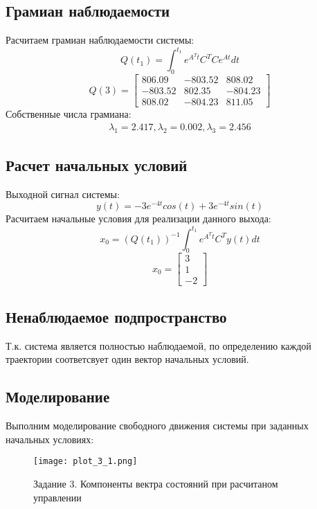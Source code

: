 \subsection{Грамиан наблюдаемости}
Расчитаем грамиан наблюдаемости системы:
\begin{equation}
    Q(t_1) = \int_{0}^{t_1}e^{A^Tt}C^TCe^{At}dt
\end{equation}
\begin{equation*}
    Q(3) = \begin{bmatrix}
        806.09 & -803.52 & 808.02 \\
        -803.52 & 802.35 & -804.23 \\
        808.02 & -804.23 & 811.05
        \end{bmatrix}
\end{equation*}
Собственные числа грамиана:
\begin{eqnarray*}
    \lambda_1 = 2.417, \lambda_2 = 0.002, \lambda_3 = 2.456
\end{eqnarray*}

\subsection{Расчет начальных условий}
Выходной сигнал системы:
\begin{equation*}
    y(t) = -3e^{-4t}cos(t) + 3e^{-4t}sin(t)
\end{equation*}
Расчитаем начальные условия для реализации данного выхода:
\begin{equation}
    x_0 = (Q(t_1))^{-1}\int_{0}^{t_1}e^{A^Tt}C^Ty(t)dt
\end{equation}
\begin{equation*}
    x_0 = \begin{bmatrix}
        3 \\ 1 \\ -2
    \end{bmatrix}
\end{equation*}

\subsection{Ненаблюдаемое подпространство}
Т.к. система является полностью наблюдаемой, по определению каждой траектории соответсвует один вектор начальных условий.

\subsection{Моделирование}
Выполним моделирование свободного движения системы при заданных начальных условиях:
\begin{figure}[h]
    \centering
    \texttt{[image: plot\_3\_1.png]}
    \caption{\label{fig:The-caption-1}Задание 3. Компоненты вектра состояний при расчитаном управлении}
\end{figure}

